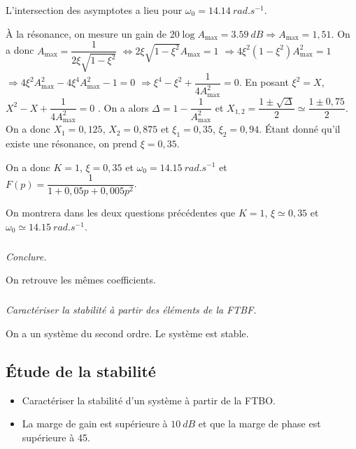 \documentclass[10pt,fleqn]{article} %
\begin{document}
\begin{multicols}{2}
\begin{corrige}
L'intersection des asymptotes a lieu pour $\omega_0=\SI{14,14}{rad.s^{-1}}$. 

À la résonance, on mesure un gain de $20\log A_{\text{max}}=\SI{3,59}{dB}\Rightarrow A_{\text{max}}=1,51$. On a donc 
$A_{\text{max}} = \dfrac{1}{2\xi\sqrt{1-\xi^2}}$
$\Leftrightarrow {2\xi\sqrt{1-\xi^2}}A_{\text{max}}=1$
$\Rightarrow 4\xi^2\left(1-\xi^2\right)A_{\text{max}}^2=1 $
$\Rightarrow 4\xi^2A_{\text{max}}^2 -4\xi^4 A_{\text{max}}^2-1=0 $
$\Rightarrow \xi^4 - \xi^2 +\dfrac{1}{4A_{\text{max}}^2}=0 $. En posant $\xi^2=X$,  
$ X^2 - X +\dfrac{1}{4A_{\text{max}}^2}=0 $
. On a alors $\Delta = 1-\dfrac{1}{A_{\text{max}}^2}$ et $X_{1,2}=\dfrac{1\pm \sqrt{\Delta}}{2}\simeq \dfrac{1\pm 0,75}{2}$. On a donc $X_1=0,125$, $X_2=0,875$ et $\xi_1=0,35$, $\xi_2=0,94$. Étant donné qu'il existe une résonance, on prend $\xi=0,35$.

 On a donc $K=1$, $\xi=0,35$ et $\omega_0=\SI{14,15}{rad.s^{-1}}$ et $F(p)=\dfrac{1}{1+0,05p+0,005p^2}$.

\end{corrige}
\else


\begin{rem}
On montrera dans les deux questions précédentes que 
$K=1$, $\xi\simeq0,35$ et $\omega_0\simeq\SI{14,15}{rad.s^{-1}}$.
\end{rem}
\fi

\subparagraph{}\textit{Conclure.}
\ifprof
\begin{corrige}
On retrouve les mêmes coefficients. 
\end{corrige}
\else
\fi

\subparagraph{}\textit{Caractériser la stabilité à partir des éléments de la FTBF.}



\ifprof
\begin{corrige}
On a un système du second ordre. Le système est stable. 
\end{corrige}
\else
\fi

\subsection*{Étude de la stabilité}

\ifprof
\else

\begin{obj}
\begin{itemize}
\item Caractériser la stabilité d'un système à partir de la FTBO.
\item La marge de gain est supérieure à $\SI{10}{dB}$ et que la marge de phase est supérieure à \SI{45}{\degres}.
\end{itemize}


\end{obj}
\end{multicols}
\end{document}
